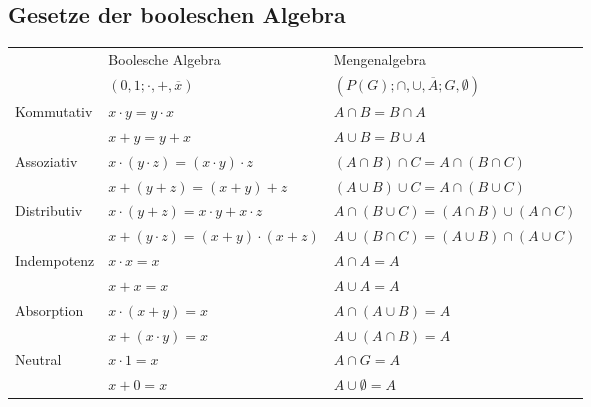 \documentclass[6pt,a4paper]{scrartcl}
\begin{document}
\begin{multicols*}{3}
	\subsection{Gesetze der booleschen Algebra}
	\begin{tabular}{l|l|l}
		            & Boolesche Algebra                                     & Mengenalgebra                                         \\
		            & $({0,1};\cdot , +, \overline{x})$                     & $(P(G);\cap , \cup, \overline{A};G,\emptyset )$       \\ \hline
		Kommutativ  & $x \cdot y = y \cdot x$                               & $A \cap B = B \cap A$                                 \\
		            & $x + y = y + x$                                       & $A \cup B = B \cup A$                                 \\
		Assoziativ  & $x \cdot (y \cdot z) = (x \cdot y) \cdot z$           & $(A \cap B) \cap C = A \cap (B \cap C)$               \\
		            & $x + (y + z) = (x + y) + z$                           & $(A \cup B) \cup C = A \cap (B \cup C)$               \\
		Distributiv & $x \cdot (y + z) = x \cdot y + x \cdot z$             & $A \cap (B \cup C) = (A \cap B) \cup (A \cap C)$      \\
		            & $x + (y \cdot z) = (x + y) \cdot (x + z)$             & $A \cup (B \cap C) = (A \cup B) \cap (A \cup C)$      \\
		Indempotenz & $x \cdot x = x$                                       & $A \cap A = A$                                        \\
		            & $x + x = x$                                           & $A \cup A = A$                                        \\
		Absorption  & $x \cdot (x+y) = x$                                   & $A \cap (A \cup B) = A$                               \\
		            & $x + (x \cdot y) = x$                                 & $A \cup (A \cap B) = A$                               \\
		Neutral     & $x \cdot 1 = x$                                       & $A \cap G = A$                                        \\
		            & $x + 0 = x$                                           & $A \cup \emptyset = A$                                \\

\end{tabular}
\end{multicols*}
\end{document}
